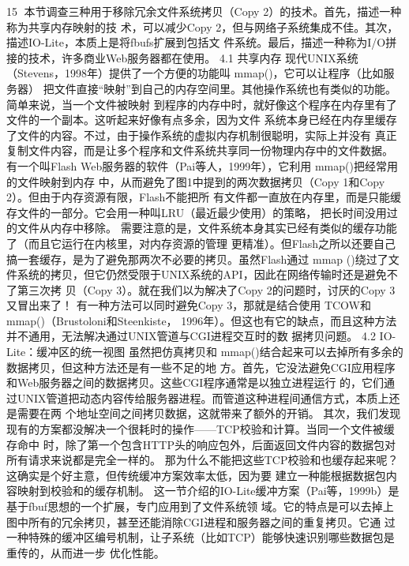                                                      15
本节调查三种用于移除冗余文件系统拷贝（Copy 2）的技术。首先，描述一种称为共享内存映射的技
术，可以减少Copy 2，但与网络子系统集成不佳。其次，描述IO-Lite，本质上是将fbufs扩展到包括文
件系统。最后，描述一种称为I/O拼接的技术，许多商业Web服务器都在使用。
4.1 共享内存
现代UNIX系统（Stevens，1998年）提供了一个方便的功能叫 ﻿mmap()﻿，它可以让程序（比如服务器）
把文件直接“映射”到自己的内存空间里。其他操作系统也有类似的功能。简单来说，当一个文件被映射
到程序的内存中时，就好像这个程序在内存里有了文件的一个副本。这听起来好像有点多余，因为文件
系统本身已经在内存里缓存了文件的内容。不过，由于操作系统的虚拟内存机制很聪明，实际上并没有
真正复制文件内容，而是让多个程序和文件系统共享同一份物理内存中的文件数据。
有一个叫Flash Web服务器的软件（Pai等人，1999年），它利用 ﻿mmap()﻿把经常用的文件映射到内存
中，从而避免了图1中提到的两次数据拷贝（Copy 1和Copy 2）。但由于内存资源有限，Flash不能把所
有文件都一直放在内存里，而是只能缓存文件的一部分。它会用一种叫LRU（最近最少使用）的策略，
把长时间没用过的文件从内存中移除。
需要注意的是，文件系统本身其实已经有类似的缓存功能了（而且它运行在内核里，对内存资源的管理
更精准）。但Flash之所以还要自己搞一套缓存，是为了避免那两次不必要的拷贝。虽然Flash通过 ﻿mmap
()﻿绕过了文件系统的拷贝，但它仍然受限于UNIX系统的API，因此在网络传输时还是避免不了第三次拷
贝（Copy 3）。就在我们以为解决了Copy 2的问题时，讨厌的Copy 3又冒出来了！
有一种方法可以同时避免Copy 3，那就是结合使用 ﻿TCOW﻿和 ﻿mmap()﻿（Brustoloni和Steenkiste，
1996年）。但这也有它的缺点，而且这种方法并不通用，无法解决通过UNIX管道与CGI进程交互时的数
据拷贝问题。
4.2 IO-Lite：缓冲区的统一视图
虽然把仿真拷贝和 mmap()﻿结合起来可以去掉所有多余的数据拷贝，但这种方法还是有一些不足的地
方。首先，它没法避免CGI应用程序和Web服务器之间的数据拷贝。这些CGI程序通常是以独立进程运行
的，它们通过UNIX管道把动态内容传给服务器进程。而管道这种进程间通信方式，本质上还是需要在两
个地址空间之间拷贝数据，这就带来了额外的开销。
其次，我们发现现有的方案都没解决一个很耗时的操作——TCP校验和计算。当同一个文件被缓存命中
时，除了第一个包含HTTP头的响应包外，后面返回文件内容的数据包对所有请求来说都是完全一样的。
那为什么不能把这些TCP校验和也缓存起来呢？这确实是个好主意，但传统缓冲方案效率太低，因为要
建立一种能根据数据包内容映射到校验和的缓存机制。
这一节介绍的IO-Lite缓冲方案（Pai等，1999b）是基于fbuf思想的一个扩展，专门应用到了文件系统领
域。它的特点是可以去掉上图中所有的冗余拷贝，甚至还能消除CGI进程和服务器之间的重复拷贝。它通
过一种特殊的缓冲区编号机制，让子系统（比如TCP）能够快速识别哪些数据包是重传的，从而进一步
优化性能。

